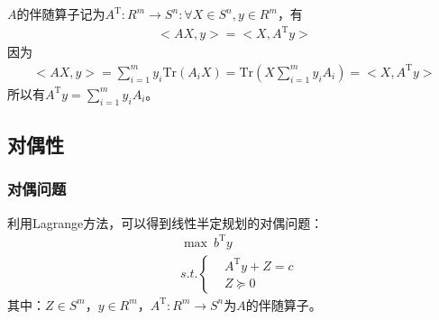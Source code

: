        $A$的伴随算子记为$A^\mathrm{T} :R^m\to S^n:\forall X\in S^n,y\in R^m$，有
        \begin{align*}
          \big<{AX,y}\big>=\big< {X,A^\mathrm{T} y}\big>
        \end{align*}
        因为
        \begin{align*}
          \big< {AX,y}\big>=\mathop{\sum}\limits_{i=1}^my_i\mathrm{Tr}(A_iX)=\mathrm{Tr} \left( X\mathop{\sum}\limits_{i=1}^my_iA_i \right) =\big< {X,A^\mathrm{T} y}\big>
        \end{align*}
        所以有$A^\mathrm{T} y=\mathop{\sum}\limits_{i=1}^my_iA_i$。
    \subsection{对偶性}
        \subsubsection{对偶问题}
            \par
            利用Lagrange方法，可以得到线性半定规划的对偶问题：
            \begin{align*}
              & \mathop{\max} \  b^\mathrm{T} y\\
              & s.t. \left\{
               \begin{aligned}
              & A^\mathrm{T} y+Z=c\\
              & Z \succeq 0
              \end{aligned}
              \right.
            \end{align*}
            其中：$Z\in S^m$，$y \in R^m$，$A^\mathrm{T} :R^m\to S^n$为$A$的伴随算子。
